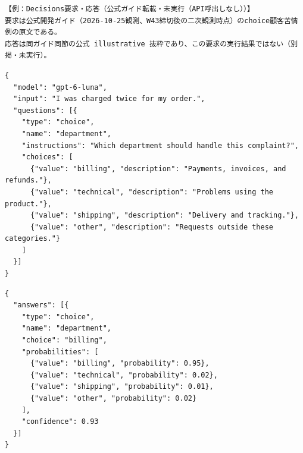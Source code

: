 \documentclass[lualatex,a4paper,10pt]{jlreq}
\begin{document}
{\footnotesize
\begin{verbatim}
【例：Decisions要求・応答（公式ガイド転載・未実行（API呼出しなし））】
要求は公式開発ガイド（2026-10-25観測、W43締切後の二次観測時点）のchoice顧客苦情例の原文である。
応答は同ガイド同節の公式 illustrative 抜粋であり、この要求の実行結果ではない（別掲・未実行）。
\end{verbatim}
} %
{\footnotesize
\begin{verbatim}
{
  "model": "gpt-6-luna",
  "input": "I was charged twice for my order.",
  "questions": [{
    "type": "choice",
    "name": "department",
    "instructions": "Which department should handle this complaint?",
    "choices": [
      {"value": "billing", "description": "Payments, invoices, and refunds."},
      {"value": "technical", "description": "Problems using the product."},
      {"value": "shipping", "description": "Delivery and tracking."},
      {"value": "other", "description": "Requests outside these categories."}
    ]
  }]
}
\end{verbatim}
} %
{\footnotesize
\begin{verbatim}
{
  "answers": [{
    "type": "choice",
    "name": "department",
    "choice": "billing",
    "probabilities": [
      {"value": "billing", "probability": 0.95},
      {"value": "technical", "probability": 0.02},
      {"value": "shipping", "probability": 0.01},
      {"value": "other", "probability": 0.02}
    ],
    "confidence": 0.93
  }]
}
\end{verbatim}
} %
\end{document}
